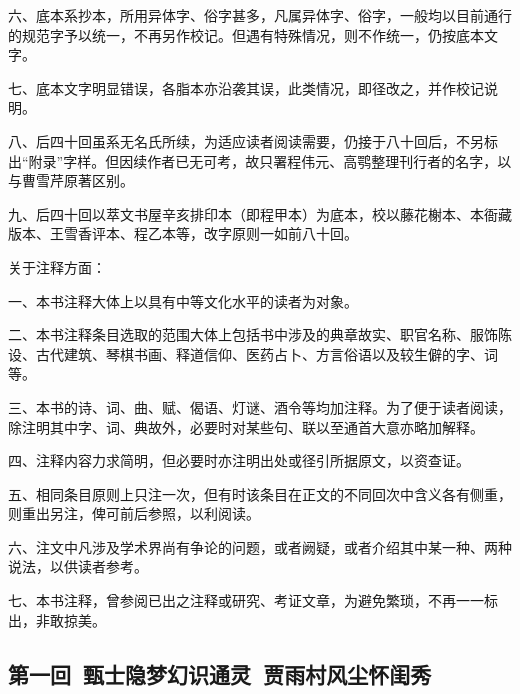 \par 六、底本系抄本，所用异体字、俗字甚多，凡属异体字、俗字，一般均以目前通行的规范字予以统一，不再另作校记。但遇有特殊情况，则不作统一，仍按底本文字。
\par 七、底本文字明显错误，各脂本亦沿袭其误，此类情况，即径改之，并作校记说明。
\par 八、后四十回虽系无名氏所续，为适应读者阅读需要，仍接于八十回后，不另标出“附录”字样。但因续作者已无可考，故只署程伟元、高鹗整理刊行者的名字，以与曹雪芹原著区别。
\par 九、后四十回以萃文书屋辛亥排印本（即程甲本）为底本，校以藤花榭本、本衙藏版本、王雪香评本、程乙本等，改字原则一如前八十回。
\par 关于注释方面：
\par 一、本书注释大体上以具有中等文化水平的读者为对象。
\par 二、本书注释条目选取的范围大体上包括书中涉及的典章故实、职官名称、服饰陈设、古代建筑、琴棋书画、释道信仰、医药占卜、方言俗语以及较生僻的字、词等。
\par 三、本书的诗、词、曲、赋、偈语、灯谜、酒令等均加注释。为了便于读者阅读，除注明其中字、词、典故外，必要时对某些句、联以至通首大意亦略加解释。
\par 四、注释内容力求简明，但必要时亦注明出处或径引所据原文，以资查证。
\par 五、相同条目原则上只注一次，但有时该条目在正文的不同回次中含义各有侧重，则重出另注，俾可前后参照，以利阅读。
\par 六、注文中凡涉及学术界尚有争论的问题，或者阙疑，或者介绍其中某一种、两种说法，以供读者参考。
\par 七、本书注释，曾参阅已出之注释或研究、考证文章，为避免繁琐，不再一一标出，非敢掠美。
\par {}
\par {}
\par {}


\subsection*{第一回\ 甄士隐梦幻识通灵\ 贾雨村风尘怀闺秀}


